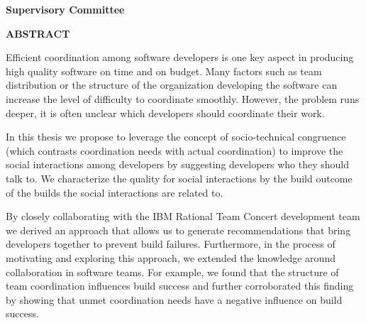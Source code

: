 \newpage
{}

\noindent \textbf{Supervisory Committee}
\tpbreak
\panel

\begin{center}
\textbf{ABSTRACT}
\end{center}
Efficient coordination among software developers is one key aspect in producing high quality software on time and on budget.
Many factors such as team distribution or the structure of the organization developing the software can increase the level of difficulty to coordinate smoothly.
However, the problem runs deeper, it is often unclear which developers should coordinate their work.

In this thesis we propose to leverage the concept of socio-technical congruence (which contrasts coordination needs with actual coordination) to improve the social interactions among developers by suggesting developers who they should talk to.
We characterize the quality for social interactions by the build outcome of the builds the social interactions are related to.

By closely collaborating with the IBM Rational Team Concert development team we derived an approach that allows us to generate recommendations that bring developers together to prevent build failures.
Furthermore, in the process of motivating and exploring this approach, we extended the knowledge around collaboration in software teams.
For example, we found that the structure of team coordination influences build success and further corroborated this finding by showing that unmet coordination needs have a negative influence on build success.

%
%
